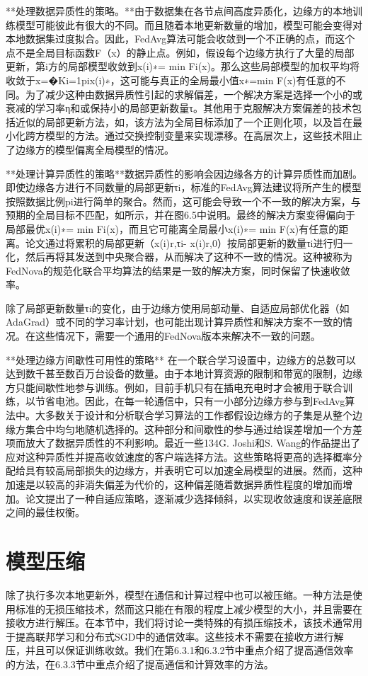 **处理数据异质性的策略。**由于数据集在各节点间高度异质化，边缘方的本地训练模型可能彼此有很大的不同。而且随着本地更新数量的增加，模型可能会变得对本地数据集过度拟合。因此，FedAvg算法可能会收敛到一个不正确的点，而这个点不是全局目标函数F（x）的静止点。例如，假设每个边缘方执行了大量的局部更新，第i方的局部模型收敛到x(i)∗= min Fi(x)。那么这些局部模型的加权平均将收敛于x=�Ki=1pix(i)∗，这可能与真正的全局最小值x∗=min F(x)有任意的不同。为了减少这种由数据异质性引起的求解偏差，一个解决方案是选择一个小的或衰减的学习率η和或保持小的局部更新数量τ。其他用于克服解决方案偏差的技术包括近似的局部更新方法，如，该方法为全局目标添加了一个正则化项，以及旨在最小化跨方模型的方法。通过交换控制变量来实现漂移。在高层次上，这些技术阻止了边缘方的模型偏离全局模型的情况。

**处理计算异质性的策略**数据异质性的影响会因边缘各方的计算异质性而加剧。即使边缘各方进行不同数量的局部更新τi，标准的FedAvg算法建议将所产生的模型按照数据比例pi进行简单的聚合。然而，这可能会导致一个不一致的解决方案，与预期的全局目标不匹配，如所示，并在图6.5中说明。最终的解决方案变得偏向于局部最优x(i)∗= min Fi(x)，而且它可能离全局最小x(i)∗= min F(x)有任意的距离。论文通过将累积的局部更新（x(i)r,τi- x(i)r,0）按局部更新的数量τi进行归一化，然后再将其发送到中央聚合器，从而解决了这种不一致的情况。这种被称为FedNova的规范化联合平均算法的结果是一致的解决方案，同时保留了快速收敛率。

除了局部更新数量τi的变化，由于边缘方使用局部动量、自适应局部优化器（如AdaGrad）或不同的学习率计划，也可能出现计算异质性和解决方案不一致的情况。在这些情况下，需要一个通用的FedNova版本来解决不一致的问题。

**处理边缘方间歇性可用性的策略** 在一个联合学习设置中，边缘方的总数可以达到数千甚至数百万台设备的数量。由于本地计算资源的限制和带宽的限制，边缘方只能间歇性地参与训练。例如，目前手机只有在插电充电时才会被用于联合训练，以节省电池。因此，在每一轮通信中，只有一小部分边缘方参与到FedAvg算法中。大多数关于设计和分析联合学习算法的工作都假设边缘方的子集是从整个边缘方集合中均匀地随机选择的。这种部分和间歇性的参与通过给误差增加一个方差项而放大了数据异质性的不利影响。最近一些134G. Joshi和S. Wang的作品提出了应对这种异质性并提高收敛速度的客户端选择方法。这些策略将更高的选择概率分配给具有较高局部损失的边缘方，并表明它可以加速全局模型的进展。然而，这种加速是以较高的非消失偏差为代价的，这种偏差随着数据异质性程度的增加而增加。论文提出了一种自适应策略，逐渐减少选择倾斜，以实现收敛速度和误差底限之间的最佳权衡。

\section{模型压缩}
除了执行多次本地更新外，模型在通信和计算过程中也可以被压缩。一种方法是使用标准的无损压缩技术，然而这只能在有限的程度上减少模型的大小，并且需要在接收方进行解压。在本节中，我们将讨论一类特殊的有损压缩技术，该技术通常用于提高联邦学习和分布式SGD中的通信效率。这些技术不需要在接收方进行解压，并且可以保证训练收敛。我们在第6.3.1和6.3.2节中重点介绍了提高通信效率的方法，在6.3.3节中重点介绍了提高通信和计算效率的方法。

